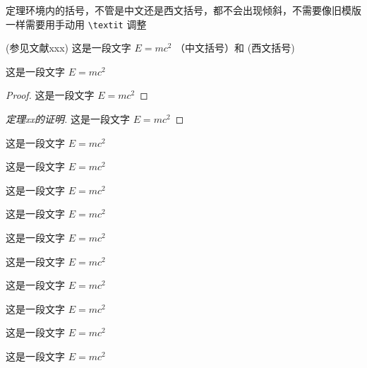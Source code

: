定理环境内的括号，不管是中文还是西文括号，都不会出现倾斜，不需要像旧模版一样需要用手动用 \verb|\textit| 调整
\begin{definition}[测度]
  (参见文献xxx) 这是一段文字 $E = m c^2$  （中文括号）和 (西文括号)
\end{definition}

\begin{theorem}
  这是一段文字 $E = m c^2$
\end{theorem}

\begin{proof}
  这是一段文字 $E = m c^2$
\end{proof}

\begin{proof}[定理xx的证明]
  这是一段文字 $E = m c^2$
\end{proof}

\begin{example}
  这是一段文字 $E = m c^2$
\end{example}

\begin{property}
  这是一段文字 $E = m c^2$
\end{property}

\begin{proposition}
  这是一段文字 $E = m c^2$
\end{proposition}

\begin{corollary}
  这是一段文字 $E = m c^2$
\end{corollary}

\begin{lemma}
  这是一段文字 $E = m c^2$
\end{lemma}

\begin{axiom}
  这是一段文字 $E = m c^2$
\end{axiom}

\begin{antiexample}
  这是一段文字 $E = m c^2$
\end{antiexample}

\begin{conjecture}
  这是一段文字 $E = m c^2$
\end{conjecture}

\begin{question}
  这是一段文字 $E = m c^2$
\end{question}

\begin{claim}
  这是一段文字 $E = m c^2$
\end{claim}

